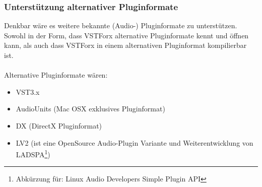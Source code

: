 \subsubsection{Unterstützung alternativer Pluginformate}
Denkbar wäre es weitere bekannte (Audio-) Pluginformate zu unterstützen. Sowohl in der Form, dass VSTForx alternative Pluginformate kennt und öffnen kann, als auch dass VSTForx in einem alternativen Pluginformat kompilierbar ist.
\\\\
Alternative Pluginformate wären:
\begin{itemize}
\item VST3.x
\item AudioUnits (Mac OSX exklusives Pluginformat)
\item DX (DirectX Pluginformat) 
\item LV2 (ist eine OpenSource Audio-Plugin Variante und Weiterentwicklung von LADSPA\footnote{Abkürzung für: Linux Audio Developers Simple Plugin API})
\end{itemize}